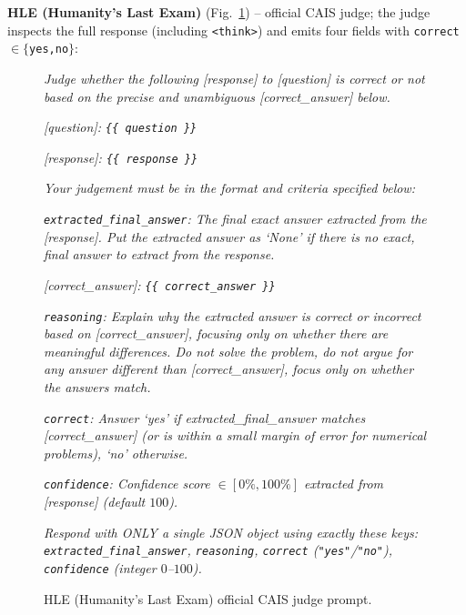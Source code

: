 \textbf{HLE (Humanity's Last Exam)} (Fig.~\ref{fig:prompt-judge-hle}) -- official CAIS judge; the judge inspects the full response (including \texttt{<think>}) and emits four fields with \texttt{correct} $\in\{$\texttt{yes,no}$\}$:
\begin{figure}[!htbp]
\begin{prompttemplatefig}
\small
\emph{Judge whether the following [response] to [question] is correct or not based on the precise and unambiguous [correct\_answer] below.}

\emph{[question]: \texttt{\{\{ question \}\}}}

\emph{[response]: \texttt{\{\{ response \}\}}}

\emph{Your judgement must be in the format and criteria specified below:}

\emph{\texttt{extracted\_final\_answer}: The final exact answer extracted from the [response]. Put the extracted answer as `None' if there is no exact, final answer to extract from the response.}

\emph{[correct\_answer]: \texttt{\{\{ correct\_answer \}\}}}

\emph{\texttt{reasoning}: Explain why the extracted answer is correct or incorrect based on [correct\_answer], focusing only on whether there are meaningful differences. Do not solve the problem, do not argue for any answer different than [correct\_answer], focus only on whether the answers match.}

\emph{\texttt{correct}: Answer `yes' if extracted\_final\_answer matches [correct\_answer] (or is within a small margin of error for numerical problems), `no' otherwise.}

\emph{\texttt{confidence}: Confidence score $\in[0\%,100\%]$ extracted from [response] (default $100$).}

\emph{Respond with ONLY a single JSON object using exactly these keys: \texttt{extracted\_final\_answer}, \texttt{reasoning}, \texttt{correct} (\texttt{"yes"}/\texttt{"no"}), \texttt{confidence} (integer $0$--$100$).}
\end{prompttemplatefig}
\caption{HLE (Humanity's Last Exam) official CAIS judge prompt.}
\label{fig:prompt-judge-hle}
\end{figure}


